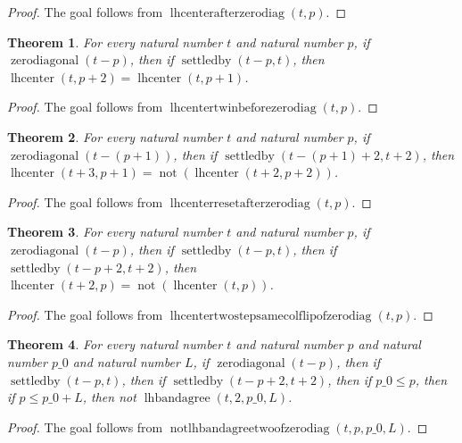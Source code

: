 \documentclass[11pt]{article}
\newtheorem{theorem}{Theorem}[section]
\theoremstyle{definition}
\begin{document}
\begin{proof}
The goal follows from \(\operatorname{lhcenterafterzerodiag}(t, p)\).
\end{proof}
\begin{theorem}
\label{ll:paper:lhcenter-twin-before-zero-diag}
For every natural number \(t\) and natural number \(p\), if \(\operatorname{zerodiagonal}(t - p)\), then if \(\operatorname{settledby}(t - p, t)\), then \(\operatorname{lhcenter}(t, p + 2) = \operatorname{lhcenter}(t, p + 1)\).
\end{theorem}
\begin{proof}
The goal follows from \(\operatorname{lhcentertwinbeforezerodiag}(t, p)\).
\end{proof}
\begin{theorem}
\label{ll:paper:lhcenter-reset-after-zero-diag}
For every natural number \(t\) and natural number \(p\), if \(\operatorname{zerodiagonal}(t - (p + 1))\), then if \(\operatorname{settledby}(t - (p + 1) + 2, t + 2)\), then \(\operatorname{lhcenter}(t + 3, p + 1) = \operatorname{not}(\operatorname{lhcenter}(t + 2, p + 2))\).
\end{theorem}
\begin{proof}
The goal follows from \(\operatorname{lhcenterresetafterzerodiag}(t, p)\).
\end{proof}
\begin{theorem}
\label{ll:paper:lhcenter-two-step-same-col-flip-of-zero-diag}
For every natural number \(t\) and natural number \(p\), if \(\operatorname{zerodiagonal}(t - p)\), then if \(\operatorname{settledby}(t - p, t)\), then if \(\operatorname{settledby}(t - p + 2, t + 2)\), then \(\operatorname{lhcenter}(t + 2, p) = \operatorname{not}(\operatorname{lhcenter}(t, p))\).
\end{theorem}
\begin{proof}
The goal follows from \(\operatorname{lhcentertwostepsamecolflipofzerodiag}(t, p)\).
\end{proof}
\begin{theorem}
\label{ll:paper:not-lhbandagree-two-of-zero-diag}
For every natural number \(t\) and natural number \(p\) and natural number \(p\_0\) and natural number \(L\), if \(\operatorname{zerodiagonal}(t - p)\), then if \(\operatorname{settledby}(t - p, t)\), then if \(\operatorname{settledby}(t - p + 2, t + 2)\), then if \(p\_0 \le p\), then if \(p \le p\_0 + L\), then not \(\operatorname{lhbandagree}(t, 2, p\_0, L)\).
\end{theorem}
\begin{proof}
The goal follows from \(\operatorname{notlhbandagreetwoofzerodiag}(t, p, p\_0, L)\).
\end{proof}
\end{document}
